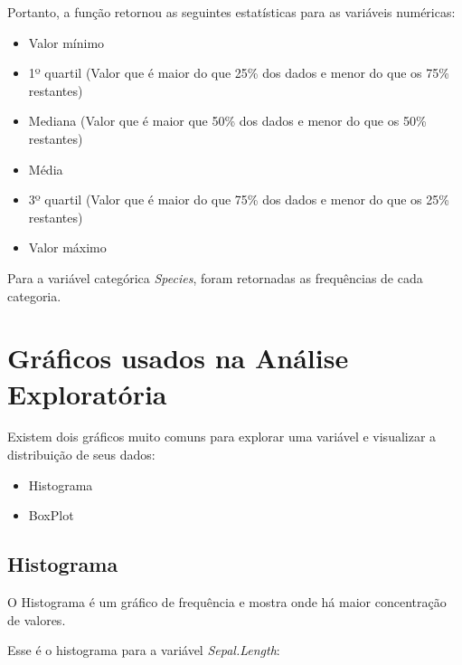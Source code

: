 \documentclass[
]{book}
\newenvironment{Shaded}{\begin{snugshade}}{\end{snugshade}}
\newcommand{\KeywordTok}[1]{\textcolor[rgb]{0.13,0.29,0.53}{\textbf{#1}}}
\newcommand{\NormalTok}[1]{#1}
\newcommand{\OperatorTok}[1]{\textcolor[rgb]{0.81,0.36,0.00}{\textbf{#1}}}
\providecommand{\tightlist}{%
  \setlength{\itemsep}{0pt}\setlength{\parskip}{0pt}}
\begin{document}
Portanto, a função retornou as seguintes estatísticas para as variáveis
numéricas:

\begin{itemize}
\tightlist
\item
  Valor mínimo
\item
  1º quartil (Valor que é maior do que 25\% dos dados e menor do que os
  75\% restantes)
\item
  Mediana (Valor que é maior que 50\% dos dados e menor do que os 50\%
  restantes)
\item
  Média
\item
  3º quartil (Valor que é maior do que 75\% dos dados e menor do que os
  25\% restantes)
\item
  Valor máximo
\end{itemize}

Para a variável categórica \emph{Species}, foram retornadas as
frequências de cada categoria.

\hypertarget{gruxe1ficos-usados-na-anuxe1lise-exploratuxf3ria}{%
\section{Gráficos usados na Análise
Exploratória}\label{gruxe1ficos-usados-na-anuxe1lise-exploratuxf3ria}}

Existem dois gráficos muito comuns para explorar uma variável e
visualizar a distribuição de seus dados:

\begin{itemize}
\tightlist
\item
  Histograma
\item
  BoxPlot
\end{itemize}

\hypertarget{histograma}{%
\subsection{Histograma}\label{histograma}}

O Histograma é um gráfico de frequência e mostra onde há maior
concentração de valores.

Esse é o histograma para a variável \emph{Sepal.Length}:

\begin{Shaded}
\end{Shaded}
\end{document}
